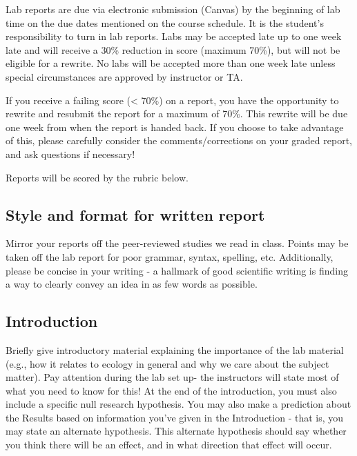 \documentclass[11pt,]{article}
\begin{document}
Lab reports are due via electronic submission (Canvas) by the beginning
of lab time on the due dates mentioned on the course schedule. It is the
student's responsibility to turn in lab reports. Labs may be accepted
late up to one week late and will receive a 30\% reduction in score
(maximum 70\%), but will not be eligible for a rewrite. No labs will be
accepted more than one week late unless special circumstances are
approved by instructor or TA.

If you receive a failing score (\textless{} 70\%) on a report, you have
the opportunity to rewrite and resubmit the report for a maximum of
70\%. This rewrite will be due one week from when the report is handed
back. If you choose to take advantage of this, please carefully consider
the comments/corrections on your graded report, and ask questions if
necessary!

Reports will be scored by the rubric below.

\subsection{Style and format for written
report}\label{style-and-format-for-written-report}

Mirror your reports off the peer-reviewed studies we read in class.
Points may be taken off the lab report for poor grammar, syntax,
spelling, etc. Additionally, please be concise in your writing - a
hallmark of good scientific writing is finding a way to clearly convey
an idea in as few words as possible.

\subsection{Introduction}\label{introduction}

Briefly give introductory material explaining the importance of the lab
material (e.g., how it relates to ecology in general and why we care
about the subject matter). Pay attention during the lab set up- the
instructors will state most of what you need to know for this! At the
end of the introduction, you must also include a specific null research
hypothesis. You may also make a prediction about the Results based on
information you've given in the Introduction - that is, you may state an
alternate hypothesis. This alternate hypothesis should say whether you
think there will be an effect, and in what direction that effect will
occur.
\end{document}
